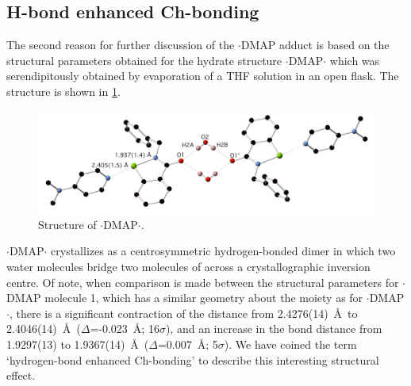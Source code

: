 \begin{refsection}
    \subsection{H-bond enhanced Ch-bonding}
    The second reason for further discussion of the $ \cdot $DMAP adduct is based on the structural parameters obtained for the hydrate structure $ \cdot $DMAP$ \cdot $ which was serendipitously obtained by evaporation of a THF solution in an open flask.
    The structure is shown in \cref{fig:benzyl-dmap-hydrate}.
    
    \begin{figure}
      \centering
      \includegraphics[width=0.8\linewidth]{Figures/benzyl-dmap-hydrate.pdf}
      \caption{Structure of $ \cdot $DMAP$ \cdot $.}\label{fig:benzyl-dmap-hydrate}
    \end{figure}
    
    $ \cdot $DMAP$ \cdot $ crystallizes as a centrosymmetric hydrogen-bonded dimer in which two water molecules bridge two molecules of  across a crystallographic inversion centre.
    Of note, when comparison is made between the structural parameters for $ \cdot $DMAP molecule 1, which has a similar geometry about the  moiety as for $ \cdot $DMAP$ \cdot $, there is a significant contraction of the distance from 2.4276(14)~\AA\ to 2.4046(14)~\AA\ ($ \Delta $=-0.023~\AA{}; 16$ \sigma $), and an increase in the  bond distance from 1.9297(13) to 1.9367(14)~\AA\ ($ \Delta $=0.007~\AA{}; 5$ \sigma $).
    We have coined the term `hydrogen-bond enhanced Ch-bonding' to describe this interesting structural effect.
    

\end{refsection}
